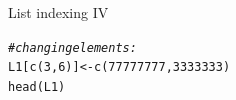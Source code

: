 \documentclass[xcolor=table,       handout,    xcolor=dvipsnames]{beamer}\usepackage[]{graphicx}\usepackage[]{color}
\makeatletter
\newcommand{\hlnum}[1]{\textcolor[rgb]{0,0,0}{#1}}
\newcommand{\hlcom}[1]{\textcolor[rgb]{0,0.392,0}{\textit{#1}}}
\newcommand{\hlstd}[1]{\textcolor[rgb]{0,0,0}{#1}}
\newcommand{\hlkwb}[1]{\textcolor[rgb]{0,0,0}{#1}}
\newcommand{\hlkwd}[1]{\textcolor[rgb]{0,0,1}{#1}}
\newenvironment{kframe}{%
 \def\at@end@of@kframe{}%
 \ifinner\ifhmode%
  \def\at@end@of@kframe{\end{minipage}}%
  \begin{minipage}{\columnwidth}%
 \fi\fi%
 \def\FrameCommand##1{\hskip\@totalleftmargin \hskip-\fboxsep
 \colorbox{shadecolor}{##1}\hskip-\fboxsep
     \hskip-\linewidth \hskip-\@totalleftmargin \hskip\columnwidth}%
 \MakeFramed {\advance\hsize-\width
   \@totalleftmargin\z@ \linewidth\hsize
   \@setminipage}}%
 {\par\unskip\endMakeFramed%
 \at@end@of@kframe}
\newenvironment{knitrout}{}{} %
\makeatother
\begin{document}

\begin{frame}[fragile]{List indexing IV}
\begin{knitrout}
\color{fgcolor}\begin{kframe}
\begin{alltt}
\hlcom{# changing elements:}
\hlstd{L1[}\hlkwd{c}\hlstd{(}\hlnum{3}\hlstd{,}\hlnum{6}\hlstd{)]}  \hlkwb{<-} \hlkwd{c}\hlstd{(}\hlnum{77777777}\hlstd{,} \hlnum{3333333}\hlstd{)}
\hlkwd{head}\hlstd{(L1)}
\end{alltt}
\end{kframe}
\end{knitrout}
\end{frame}

\end{document}
